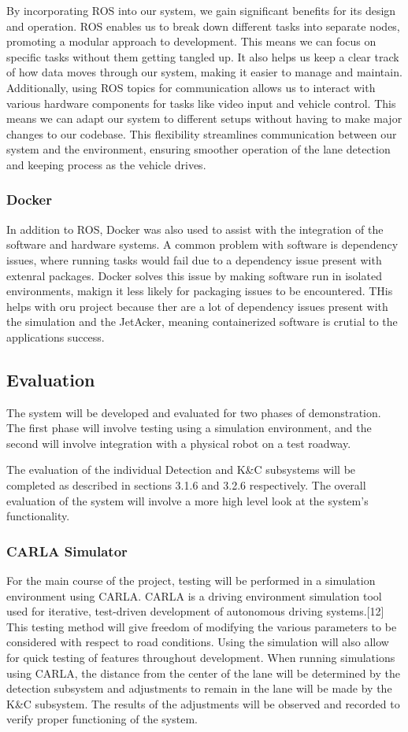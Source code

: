 \documentclass[titlepage]{article}
\begin{document}
By incorporating ROS into our system, we gain significant benefits for its design and operation. ROS enables us to break down different tasks into separate nodes, promoting a modular approach to development. This means we can focus on specific tasks without them getting tangled up. It also helps us keep a clear track of how data moves through our system, making it easier to manage and maintain. Additionally, using ROS topics for communication allows us to interact with various hardware components for tasks like video input and vehicle control. This means we can adapt our system to different setups without having to make major changes to our codebase. This flexibility streamlines communication between our system and the environment, ensuring smoother operation of the lane detection and keeping process as the vehicle drives.


\subsubsection{Docker}
In addition to ROS, Docker was also used to assist with the integration of the software and hardware systems. A common problem with software is dependency issues, where running tasks would fail due to a dependency issue present with extenral packages. Docker solves this issue by making software run in isolated environments, makign it less likely for packaging issues to be encountered. THis helps with oru project because ther are a lot of dependency issues present with the simulation and the JetAcker, meaning containerized software is crutial to the applications success.


\subsection{Evaluation}
The system will be developed and evaluated for two phases of demonstration. The first phase will involve testing using a simulation environment, and the second will involve integration with a physical robot on a test roadway. 

The evaluation of the individual Detection and K\&C subsystems will be completed as described in sections 3.1.6 and 3.2.6 respectively. The overall evaluation of the system will involve a more high level look at the system’s functionality. 

\subsubsection{CARLA Simulator}
For the main course of the project, testing will be performed in a simulation environment using CARLA. CARLA is a driving environment simulation tool used for iterative, test-driven development of autonomous driving systems.[12] This testing method will give freedom of modifying the various parameters to be considered with respect to road conditions. Using the simulation will also allow for quick testing of features throughout development. When running simulations using CARLA, the distance from the center of the lane will be determined by the detection subsystem and adjustments to remain in the lane will be made by the K\&C subsystem. The results of the adjustments will be observed and recorded to verify proper functioning of the system. 
\end{document}
